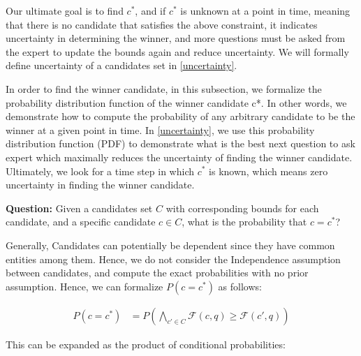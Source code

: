 Our ultimate goal is to find $c^*$, and if $c^*$ is unknown at a point in time, meaning that there is no candidate that satisfies the above constraint, it indicates uncertainty in determining the winner, and more questions must be asked from the expert to update the bounds again and reduce uncertainty. We will formally define uncertainty of a candidates set in \autoref{uncertainty}.

In order to find the winner candidate, in this subsection, we formalize the probability distribution function of the winner candidate c*. In other words, we demonstrate how to compute the probability of any arbitrary candidate to be the winner at a given point in time. In \autoref{uncertainty}, we use this probability distribution function (PDF) to demonstrate what is the best next question to ask expert which maximally reduces the uncertainty of finding the winner candidate. Ultimately, we look for a time step in which $c^*$ is known, which means zero uncertainty in finding the winner candidate. 

\textbf{Question:} Given a candidates set $C$ with corresponding bounds for each candidate, and a specific candidate $c \in C$, what is the probability that $c = c^*$?

\begin{comment}
In order to find this probability, we consider two different cases. 

\textbf{Case 1 - Independence assumption}: In this case, we assume that the candidates are independent. Hence, we can compute $P(c = c^*)$ as follows:


\[
P(c = c^*) = \prod_{c' \in C} P(\mathcal{F}(c, q) \geq \mathcal{F}(c', q))
\]

\textbf{\textcolor{red}{An example needs to be added here}}

\end{comment}
Generally, Candidates can potentially be dependent since they have common entities among them. Hence, we do not consider the Independence assumption between candidates, and compute the exact probabilities with no prior assumption. Hence, we can formalize $P(c = c^*)$ as follows:

\begin{align*}
P(c = c^*) &= P\left(\bigwedge_{c' \in C} \mathcal{F}(c, q) \geq \mathcal{F}(c', q)\right)
\end{align*}



This can be expanded as the product of conditional probabilities:

